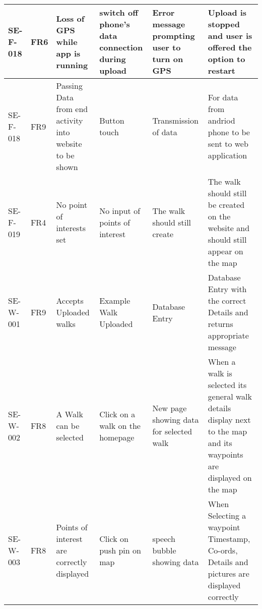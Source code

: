 \documentclass{project}
\begin{document}
\begin{small}
\begin{longtable}{ | p{1cm} | p{1cm} | p{2.5cm} | p{2.5cm} | p{2.5cm} | p{2.5cm} |}
SE-F-018
& FR6
& Loss of GPS while app is running
& switch off phone's data connection during upload
& Error message prompting user to turn on GPS
& Upload is stopped and user is offered the option to restart \\ \hline

SE-F-018
& FR9
& Passing Data from end activity into website to be shown
& Button touch
& Transmission of data
& For data from andriod phone to be sent to web application  \\ \hline

SE-F-019
& FR4
& No point of interests set
& No input of points of interest
& The walk should still create
& The walk should still be created on the website and should still appear on the map \\ \hline

SE-W-001
& FR9
& Accepts Uploaded walks
& Example Walk Uploaded
& Database Entry
& Database Entry with the correct Details and returns appropriate message
\\ \hline

SE-W-002
& FR8
& A Walk can be selected
& Click on a walk on the homepage
& New page showing data for selected walk
& When a walk is selected its general walk details display next to the 
map and its waypoints are displayed on the map
\\ \hline

SE-W-003
& FR8
& Points of interest are correctly displayed
& Click on push pin on map
& speech bubble showing data
& When Selecting a waypoint Timestamp, Co-ords, Details and pictures
are displayed correctly\\ \hline






\end{longtable}
\end{small}





\end{document}
